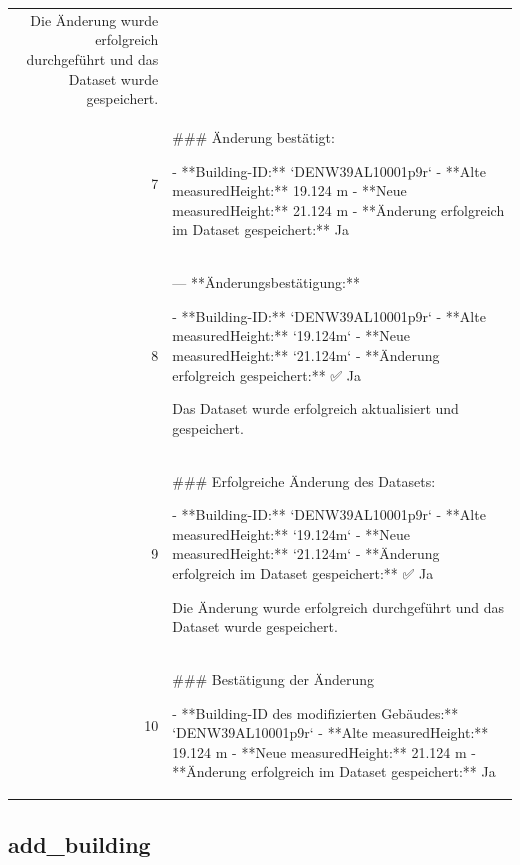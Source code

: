 \documentclass[a4paper,11pt]{article}
\begin{document}
\begin{table}[ht]
\begin{tabular}{r p{12cm}}
Die Änderung wurde erfolgreich durchgeführt und das Dataset wurde gespeichert. \\
7 & \#\#\# Änderung bestätigt:

- **Building-ID:** `DENW39AL10001p9r`
- **Alte measuredHeight:** 19.124 m
- **Neue measuredHeight:** 21.124 m
- **Änderung erfolgreich im Dataset gespeichert:** Ja \\
8 & ---
**Änderungsbestätigung:**

- **Building-ID:** `DENW39AL10001p9r`
- **Alte measuredHeight:** `19.124m`
- **Neue measuredHeight:** `21.124m`
- **Änderung erfolgreich gespeichert:** ✅ Ja

Das Dataset wurde erfolgreich aktualisiert und gespeichert. \\
9 & \#\#\# Erfolgreiche Änderung des Datasets:

- **Building-ID:** `DENW39AL10001p9r`
- **Alte measuredHeight:** `19.124m`
- **Neue measuredHeight:** `21.124m`
- **Änderung erfolgreich im Dataset gespeichert:** ✅ Ja

Die Änderung wurde erfolgreich durchgeführt und das Dataset wurde gespeichert. \\
10 & \#\#\# Bestätigung der Änderung

- **Building-ID des modifizierten Gebäudes:** `DENW39AL10001p9r`
- **Alte measuredHeight:** 19.124 m
- **Neue measuredHeight:** 21.124 m
- **Änderung erfolgreich im Dataset gespeichert:** Ja \\
\hline
\end{tabular}
\end{table}

\clearpage
\subsection{add\_building}
\end{document}
